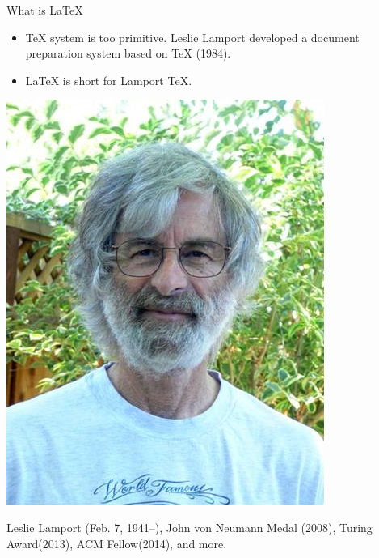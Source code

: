 \documentclass[10pt,t]{beamer}
\begin{document}
\begin{frame}{What is \LaTeX}
\begin{itemize}
    \item \TeX{} system is too primitive. Leslie Lamport developed a document
    preparation system based on \TeX{} (1984).

\item \LaTeX{} is short for \alert{La}mport \alert{TeX}.
\end{itemize}
\begin{center}
    \includegraphics[height=.5\textheight]{Leslie-Lamport.jpg}
\end{center}
    Leslie Lamport (Feb. 7, 1941--),
    John von Neumann Medal (2008),
    Turing Award(2013), ACM Fellow(2014), and more.
\end{frame}
\end{document}
